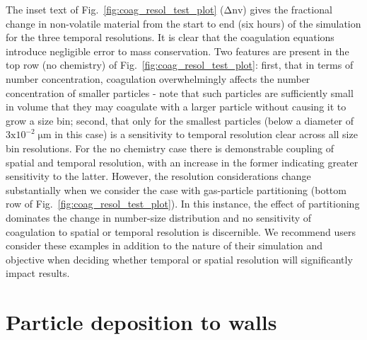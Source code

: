 \documentclass[gmd, manuscript]{copernicus}
\begin{document}
The inset text of Fig.~\ref{fig:coag_resol_test_plot} ($\mathrm{\Delta nv}$) gives the fractional change in non-volatile material from the start to end (six hours) of the simulation for the three temporal resolutions.  It is clear that the coagulation equations introduce negligible error to mass conservation.  Two features are present in the top row (no chemistry) of Fig.~\ref{fig:coag_resol_test_plot}: first, that in terms of number concentration, coagulation overwhelmingly affects the number concentration of smaller particles - note that such particles are sufficiently small in volume that they may coagulate with a larger particle without causing it to grow a size bin; second, that only for the smallest particles (below a diameter of $\mathrm{3x10^{-2}\; \mu m}$ in this case) is a sensitivity to temporal resolution clear across all size bin resolutions.  For the no chemistry case there is demonstrable coupling of spatial and temporal resolution, with an increase in the former indicating greater sensitivity to the latter.  However, the resolution considerations change substantially when we consider the case with gas-particle partitioning (bottom row of Fig.~\ref{fig:coag_resol_test_plot}).  In this instance, the effect of partitioning dominates the change in number-size distribution and no sensitivity of coagulation to spatial or temporal resolution is discernible.  We recommend users consider these examples in addition to the nature of their simulation and objective when deciding whether temporal or spatial resolution will significantly impact results.



\section{Particle deposition to walls}\label{sec:part2wall}
\end{document}
